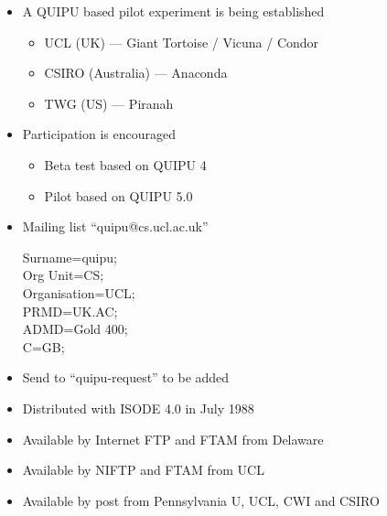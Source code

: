 \begin {bwslide}

\begin {itemize}
\item A QUIPU based pilot experiment is being established
\begin {itemize}
\item  UCL (UK) --- Giant Tortoise / Vicuna / Condor
\item CSIRO (Australia) --- Anaconda
\item TWG (US) --- Piranah
\end {itemize}
\item Participation is encouraged
\begin {itemize}
\item Beta test based on QUIPU 4
\item Pilot based on QUIPU 5.0
\end {itemize}

\item Mailing list ``quipu@cs.ucl.ac.uk''
\begin {center}
\begin {tabbing}
Surname=quipu; \\
Org Unit=CS; \\
Organisation=UCL; \\
PRMD=UK.AC; \\
ADMD=Gold 400; \\
C=GB; \\
\end {tabbing}
\end {center}
\item Send to ``quipu-request'' to be added
\end {itemize}
\end {bwslide}


\begin {bwslide}
\begin {itemize}
\item Distributed with ISODE 4.0 in July 1988
\item Available by Internet FTP and FTAM from Delaware
\item Available by NIFTP and FTAM from UCL
\item Available by post from Pennsylvania U, UCL, CWI and CSIRO
\end {itemize}

\end {bwslide}


